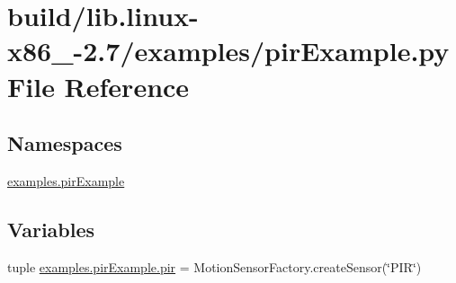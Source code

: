 \hypertarget{build_2lib_8linux-x86__64-2_87_2examples_2pirExample_8py}{}\section{build/lib.linux-\/x86\+\_-\/2.7/examples/pir\+Example.py File Reference}
\label{build_2lib_8linux-x86__64-2_87_2examples_2pirExample_8py}
\subsection*{Namespaces}
\begin{DoxyCompactItemize}
\item 
 \hyperlink{namespaceexamples_1_1pirExample}{examples.\+pir\+Example}
\end{DoxyCompactItemize}
\subsection*{Variables}
\begin{DoxyCompactItemize}
\item 
tuple \hyperlink{namespaceexamples_1_1pirExample_ace75b772e547819e1aa1ba203b2e79bd}{examples.\+pir\+Example.\+pir} = Motion\+Sensor\+Factory.\+create\+Sensor(\char`\"{}P\+I\+R\char`\"{})
\end{DoxyCompactItemize}
